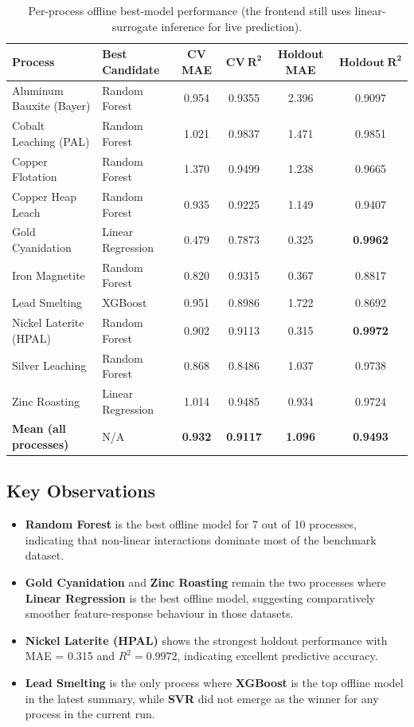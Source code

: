 \documentclass[12pt,a4paper]{report}
\begin{document}
\begin{table}[H]
\centering
\caption{Per-process offline best-model performance (the frontend still uses linear-surrogate inference for live prediction).}
\label{tab:model_results}
\footnotesize
\begin{tabular}{@{} l l c c c c @{}}
\toprule
\textbf{Process} & \textbf{Best Candidate} & \textbf{CV MAE} & $\boldsymbol{CV\ R^2}$ & \textbf{Holdout MAE} & $\boldsymbol{Holdout\ R^2}$ \\
\midrule
Aluminum Bauxite (Bayer)  & Random Forest    & 0.954 & 0.9355 & 2.396 & 0.9097 \\
Cobalt Leaching (PAL)     & Random Forest    & 1.021 & 0.9837 & 1.471 & 0.9851 \\
Copper Flotation          & Random Forest    & 1.370 & 0.9499 & 1.238 & 0.9665 \\
Copper Heap Leach         & Random Forest    & 0.935 & 0.9225 & 1.149 & 0.9407 \\
Gold Cyanidation          & Linear Regression & 0.479 & 0.7873 & 0.325 & \textbf{0.9962} \\
Iron Magnetite            & Random Forest    & 0.820 & 0.9315 & 0.367 & 0.8817 \\
Lead Smelting             & XGBoost          & 0.951 & 0.8986 & 1.722 & 0.8692 \\
Nickel Laterite (HPAL)    & Random Forest    & 0.902 & 0.9113 & 0.315 & \textbf{0.9972} \\
Silver Leaching           & Random Forest    & 0.868 & 0.8486 & 1.037 & 0.9738 \\
Zinc Roasting             & Linear Regression & 1.014 & 0.9485 & 0.934 & 0.9724 \\
\midrule
\textbf{Mean (all processes)} & N/A & \textbf{0.932} & \textbf{0.9117} & \textbf{1.096} & \textbf{0.9493} \\
\bottomrule
\end{tabular}
\end{table}

\subsection{Key Observations}

\begin{itemize}
  \item \textbf{Random Forest} is the best offline model for 7 out of 10 processes, indicating that non-linear interactions dominate most of the benchmark dataset.
  \item \textbf{Gold Cyanidation} and \textbf{Zinc Roasting} remain the two processes where \textbf{Linear Regression} is the best offline model, suggesting comparatively smoother feature-response behaviour in those datasets.
  \item \textbf{Nickel Laterite (HPAL)} shows the strongest holdout performance with MAE = 0.315 and $R^2 = 0.9972$, indicating excellent predictive accuracy.
  \item \textbf{Lead Smelting} is the only process where \textbf{XGBoost} is the top offline model in the latest summary, while \textbf{SVR} did not emerge as the winner for any process in the current run.
\end{itemize}
\end{document}
